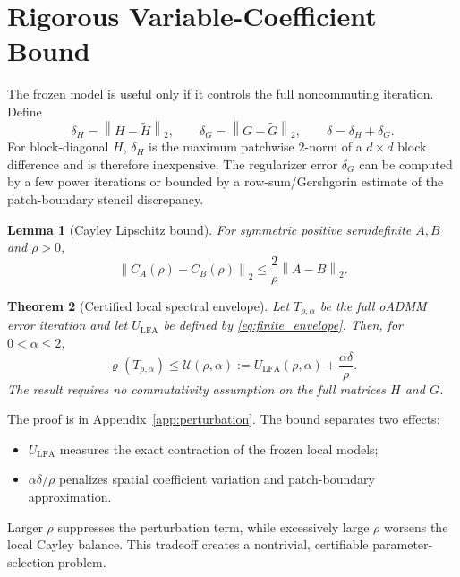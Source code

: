\documentclass[11pt]{article}
\newtheorem{theorem}{Theorem}[section]
\newtheorem{lemma}[theorem]{Lemma}
\theoremstyle{definition}
\newcommand{\norm}[1]{\left\lVert #1\right\rVert}
\newcommand{\spr}{\varrho}
\begin{document}
\section{Rigorous Variable-Coefficient Bound}
The frozen model is useful only if it controls the full noncommuting iteration. Define
\begin{equation}
\delta_H=\norm{H-\widetilde H}_2,
\qquad
\delta_G=\norm{G-\widetilde G}_2,
\qquad
\delta=\delta_H+\delta_G.
\label{eq:deltas}
\end{equation}
For block-diagonal $H$, $\delta_H$ is the maximum patchwise $2$-norm of a $d\times d$ block difference and is therefore inexpensive. The regularizer error $\delta_G$ can be computed by a few power iterations or bounded by a row-sum/Gershgorin estimate of the patch-boundary stencil discrepancy.

\begin{lemma}[Cayley Lipschitz bound]\label{lem:cayley_lipschitz}
For symmetric positive semidefinite $A,B$ and $\rho>0$,
\begin{equation}
\norm{C_A(\rho)-C_B(\rho)}_2
\le\frac{2}{\rho}\norm{A-B}_2.
\label{eq:cayley_lipschitz}
\end{equation}
\end{lemma}

\begin{theorem}[Certified local spectral envelope]\label{thm:certified}
Let $T_{\rho,\alpha}$ be the full oADMM error iteration and let $U_{\mathrm{LFA}}$ be defined by \eqref{eq:finite_envelope}. Then, for $0<\alpha\le2$,
\begin{equation}
\boxed{
\spr(T_{\rho,\alpha})
\le
\mathcal U(\rho,\alpha)
:=U_{\mathrm{LFA}}(\rho,\alpha)
+\frac{\alpha\delta}{\rho}.
}
\label{eq:certified_envelope}
\end{equation}
The result requires no commutativity assumption on the full matrices $H$ and $G$.
\end{theorem}

The proof is in Appendix~\ref{app:perturbation}. The bound separates two effects:
\begin{itemize}[leftmargin=2em]
\item $U_{\mathrm{LFA}}$ measures the exact contraction of the frozen local models;
\item $\alpha\delta/\rho$ penalizes spatial coefficient variation and patch-boundary approximation.
\end{itemize}
Larger $\rho$ suppresses the perturbation term, while excessively large $\rho$ worsens the local Cayley balance. This tradeoff creates a nontrivial, certifiable parameter-selection problem.
\end{document}

